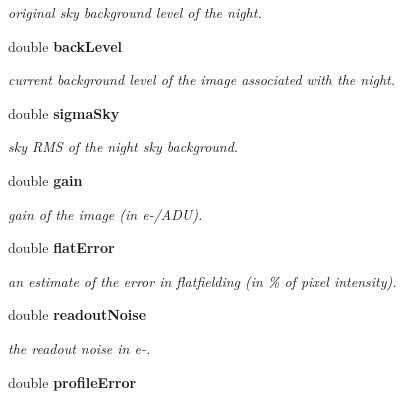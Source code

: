 \begin{CompactItemize}
\begin{CompactList}\small\item\em original sky background level of the night.\item\end{CompactList}\item 
{}
double {\bf back\-Level}\label{class_night_m11}

\begin{CompactList}\small\item\em current background level of the image associated with the night.\item\end{CompactList}\item 
{}
double {\bf sigma\-Sky}\label{class_night_m12}

\begin{CompactList}\small\item\em sky RMS of the night sky background.\item\end{CompactList}\item 
{}
double {\bf gain}\label{class_night_m13}

\begin{CompactList}\small\item\em gain of the image (in e-/ADU).\item\end{CompactList}\item 
{}
double {\bf flat\-Error}\label{class_night_m14}

\begin{CompactList}\small\item\em an estimate of the error in flatfielding (in \% of pixel intensity).\item\end{CompactList}\item 
{}
double {\bf readout\-Noise}\label{class_night_m15}

\begin{CompactList}\small\item\em the readout noise in e-.\item\end{CompactList}\item 
{}
double {\bf profile\-Error}\label{class_night_m16}


\end{CompactItemize}
